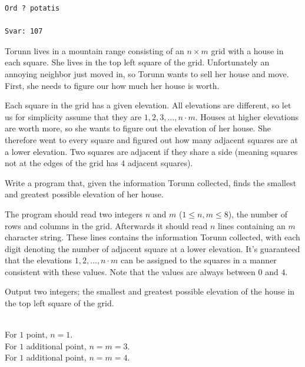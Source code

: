 \begin{verbatim}
Ord ? potatis

Svar: 107
\end{verbatim}


\newpage
{}


\noindent
Torunn lives in a mountain range consisting of an $n \times m$ grid with a house in each square.
She lives in the top left square of the grid.
Unfortunately an annoying neighbor just moved in, so Torunn wants to sell her house and move.
First, she needs to figure our how much her house is worth.

Each square in the grid has a given elevation.
All elevations are different, so let us for simplicity assume that they are $1, 2, 3, \dots, n\cdot m$.
Houses at higher elevations are worth more, so she wants to figure out the elevation of her house.
She therefore went to every square and figured out how many adjacent squares are at a lower elevation.
Two squares are adjacent if they share a side (meaning squares not at the edges of the grid has $4$ adjacent squares).

Write a program that, given the information Torunn collected, finds the smallest and greatest possible elevation of her house.

The program should read two integers $n$ and $m$ ($1 \leq n,m \leq 8$), the number of rows and columns in the grid.
Afterwards it should read $n$ lines containing an $m$ character string.
These lines contains the information Torunn collected, with each digit denoting the number of adjacent square at a lower elevation.
It's guaranteed that the elevations $1, 2, \dots, n\cdot m$ can be assigned to the squares in a manner consistent with these values.
Note that the values are always between $0$ and $4$.

Output two integers; the smallest and greatest possible elevation of the house in the top left square of the grid.

\\
For $1$ point, $n = 1$.\\
For $1$ additional point, $n = m = 3$.\\
For $1$ additional point, $n = m = 4$.\\

\vspace{0.5cm}

